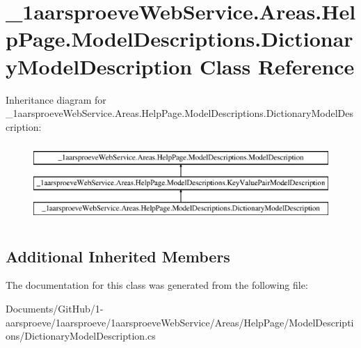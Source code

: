 \hypertarget{class__1aarsproeve_web_service_1_1_areas_1_1_help_page_1_1_model_descriptions_1_1_dictionary_model_description}{}\section{\+\_\+1aarsproeve\+Web\+Service.\+Areas.\+Help\+Page.\+Model\+Descriptions.\+Dictionary\+Model\+Description Class Reference}
\label{class__1aarsproeve_web_service_1_1_areas_1_1_help_page_1_1_model_descriptions_1_1_dictionary_model_description}
Inheritance diagram for \+\_\+1aarsproeve\+Web\+Service.\+Areas.\+Help\+Page.\+Model\+Descriptions.\+Dictionary\+Model\+Description\+:\begin{figure}[H]
\begin{center}
\leavevmode
\includegraphics[height=3.000000cm]{class__1aarsproeve_web_service_1_1_areas_1_1_help_page_1_1_model_descriptions_1_1_dictionary_model_description}
\end{center}
\end{figure}
\subsection*{Additional Inherited Members}


The documentation for this class was generated from the following file\+:\begin{DoxyCompactItemize}
\item 
Documents/\+Git\+Hub/1-\/aarsproeve/1aarsproeve/1aarsproeve\+Web\+Service/\+Areas/\+Help\+Page/\+Model\+Descriptions/Dictionary\+Model\+Description.\+cs\end{DoxyCompactItemize}
